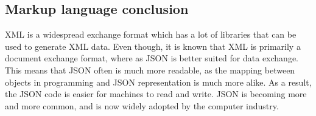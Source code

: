 \subsection{Markup language conclusion}
XML is a widespread exchange format which has a lot of libraries that can be used to generate XML data. Even though, it is known that XML is primarily a document exchange format, where as JSON is better suited for data exchange. This means that JSON often is much more readable, as the mapping between objects in programming and JSON representation is much more alike. As a result, the JSON code is easier for machines to read and write. JSON is becoming more and more common, and is now widely adopted by the computer industry. 